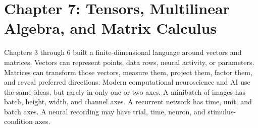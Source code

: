 \section{Chapter 7: Tensors, Multilinear Algebra, and Matrix Calculus}
\label{ch:tensors-multilinear-matrix-calculus}

Chapters 3 through 6 built a finite-dimensional language around vectors and matrices. Vectors can represent points, data rows, neural activity, or parameters. Matrices can transform those vectors, measure them, project them, factor them, and reveal preferred directions. Modern computational neuroscience and AI use the same ideas, but rarely in only one or two axes. A minibatch of images has batch, height, width, and channel axes. A recurrent network has time, unit, and batch axes. A neural recording may have trial, time, neuron, and stimulus-condition axes.

